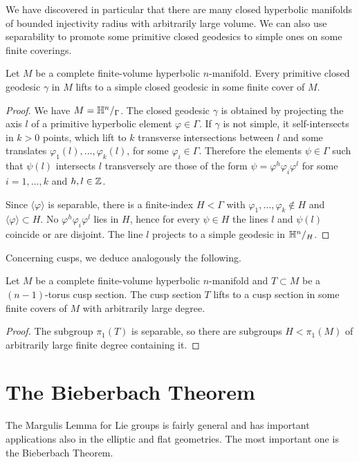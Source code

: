 We have discovered in particular that there are many closed hyperbolic manifolds of bounded injectivity radius with arbitrarily large volume.
We can also use separability to promote some primitive closed geodesics to simple ones on some finite coverings.

\begin{cor}
Let $M$ be a complete finite-volume hyperbolic $n$-manifold. Every primitive closed geodesic $\gamma$ in $M$ lifts to a simple closed geodesic in some finite cover of $M$.
\end{cor}
\begin{proof}
We have $M= \mathbb{H}^n/_\Gamma$. The closed geodesic $\gamma$ is obtained by projecting the axis $l$ of a primitive hyperbolic element $\varphi \in \Gamma$. If $\gamma$ is not simple, it self-intersects in $k>0$ points, which lift to $k$ transverse intersections between $l$ and some translates $\varphi_1(l), \ldots, \varphi_k(l)$, for some $\varphi_i \in \Gamma$. Therefore the elements $\psi \in \Gamma$ such that $\psi(l)$ intersects $l$ transversely are those of the form $\psi = \varphi^h\varphi_i\varphi^l$ for some $i=1,\ldots, k$ and $h,l \in \mathbb{Z}$.

Since $\langle \varphi \rangle$ is separable, there is a finite-index $H<\Gamma$ with $\varphi_1, \ldots, \varphi_k \not\in H$ and $\langle \varphi \rangle \subset H$. No $\varphi^h\varphi_i\varphi^l$ lies in $H$, hence for every $\psi\in H$ the lines $l$ and $\psi(l)$ coincide or are disjoint. The line $l$ projects to a simple geodesic in $\mathbb{H}^n/_H$.
\end{proof}

Concerning cusps, we deduce analogously the following.

\begin{cor}
Let $M$ be a complete finite-volume hyperbolic $n$-manifold and $T\subset M$ be a $(n-1)$-torus cusp section. The cusp section $T$ lifts to a cusp section in some finite covers of $M$ with arbitrarily large degree.
\end{cor}
\begin{proof}
The subgroup $\pi_1(T)$ is separable, so there are subgroups $H<\pi_1(M)$ of arbitrarily large finite degree containing it.
\end{proof}

\section{The Bieberbach Theorem} \label{Bieberbach:section}
The Margulis Lemma for Lie groups is fairly general and has important applications also in the elliptic and flat geometries. The most important one is the Bieberbach Theorem.

